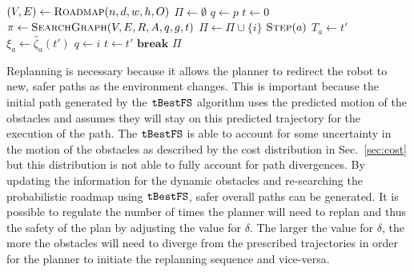 \begin{algorithm}[ht]
    \caption{$\Function{Dodger}(n, d, w, h, \delta, p, g, O, A, R)$}
    \\\algorithmicensure{}
    \label{algo:path}
    \begin{algorithmic}[1]
        \setcounter{ALC@line}{0}
        \STATE $(V, E) \leftarrow \Function{Roadmap}(n, d, w, h, O)$
        \STATE $\Pi \leftarrow \emptyset$
        \STATE $q \leftarrow p$
        \STATE $t \leftarrow 0$
            \STATE $\pi \leftarrow \Function{SearchGraph}(V, E, R, A, q, g, t)$
                \STATE $\Pi \leftarrow \Pi \cup \{i\}$
                    \STATE $\Function{Step}(a)$
                \ENDFOR
                        \STATE $T_a \leftarrow t'$
                        \STATE $\xi_a \leftarrow \tilde{\zeta_a}(t')$
                    \ENDFOR
                    \STATE $q \leftarrow i$
                    \STATE $t \leftarrow t'$
                    \STATE $\textbf{break}$
                \ENDIF
            \ENDFOR
        \ENDWHILE
        \RETURN $\Pi$
    \end{algorithmic}
\end{algorithm}

Replanning is necessary because it allows the planner to redirect the robot to
new, safer paths as the environment changes. This is important because the
initial path generated by the $\Acronym{tBestFS}$ algorithm uses the predicted
motion of the obstacles and assumes they will stay on this predicted trajectory
for the execution of the path. The $\Acronym{tBestFS}$ is able to account for
some uncertainty in the motion of the obstacles as described by the cost
distribution in Sec.~\ref{sec:cost} but this distribution is not able to fully
account for path divergences. By updating the information for the dynamic
obstacles and re-searching the probabilistic roadmap using $\Acronym{tBestFS}$,
safer overall paths can be generated. It is possible to regulate the number of
times the planner will need to replan and thus the safety of the plan by
adjusting the value for $\delta$. The larger the value for $\delta$, the more
the obstacles will need to diverge from the prescribed trajectories in order
for the planner to initiate the replanning sequence and vice-versa.

